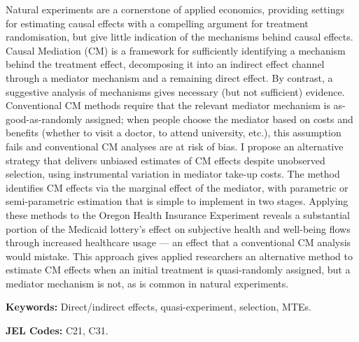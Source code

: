 \noindent
Natural experiments are a cornerstone of applied economics, providing settings for estimating causal effects with a compelling argument for treatment randomisation, but give little indication of the mechanisms behind causal effects.
Causal Mediation (CM) is a framework for sufficiently identifying a mechanism behind the treatment effect, decomposing it into an indirect effect channel through a mediator mechanism and a remaining direct effect.
By contrast, a suggestive analysis of mechanisms gives necessary (but not sufficient) evidence.
Conventional CM methods require that the relevant mediator mechanism is as-good-as-randomly assigned; when people choose the mediator based on costs and benefits (whether to visit a doctor, to attend university, etc.), this assumption fails and conventional CM analyses are at risk of bias.
I propose an alternative strategy that delivers unbiased estimates of CM effects despite unobserved selection, using instrumental variation in mediator take-up costs.
The method identifies CM effects via the marginal effect of the mediator, with parametric or semi-parametric estimation that is simple to implement in two stages.
Applying these methods to the Oregon Health Insurance Experiment reveals a substantial portion of the Medicaid lottery's effect on subjective health and well-being flows through increased healthcare usage --- an effect that a conventional CM analysis would mistake.
This approach gives applied researchers an alternative method to estimate CM effects when an initial treatment is quasi-randomly assigned, but a mediator mechanism is not, as is common in natural experiments.

\vspace{0.5cm}
\noindent
\textbf{Keywords:}
Direct/indirect effects, quasi-experiment, selection, MTEs.

\vspace{0.1cm}
\noindent
\textbf{JEL Codes:}
C21, C31.
